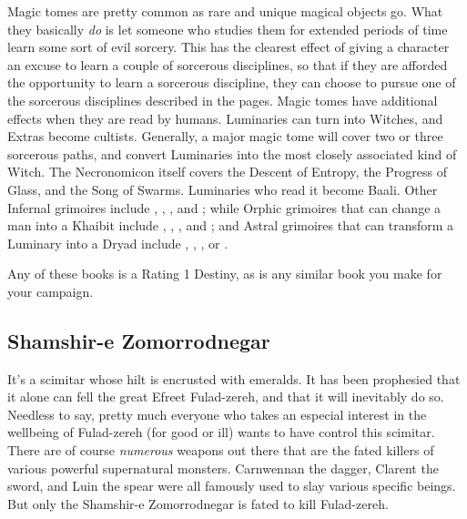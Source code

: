 Magic tomes are pretty common as rare and unique magical objects go. What they basically \textit{do} is let someone who studies them for extended periods of time learn some sort of evil sorcery. This has the clearest effect of giving a character an excuse to learn a couple of sorcerous disciplines, so that if they are afforded the opportunity to learn a sorcerous discipline, they can choose to pursue one of the sorcerous disciplines described in the pages. Magic tomes have additional effects when they are read by humans. Luminaries can turn into Witches, and Extras become cultists. Generally, a major magic tome will cover two or three sorcerous paths, and convert Luminaries into the most closely associated kind of Witch. The Necronomicon itself covers the Descent of Entropy, the Progress of Glass, and the Song of Swarms. Luminaries who read it become Baali. Other Infernal grimoires include , , , and ; while Orphic grimoires that can change a man into a Khaibit include , , , and ; and Astral grimoires that can transform a Luminary into a Dryad include , , , or .

Any of these books is a Rating 1 Destiny, as is any similar book you make for your campaign.

\subsection{Shamshir-e Zomorrodnegar}
\hspace{\parindent} It's a scimitar whose hilt is encrusted with emeralds. It has been prophesied that it alone can fell the great Efreet Fulad-zereh, and that it will inevitably do so. Needless to say, pretty much everyone who takes an especial interest in the wellbeing of Fulad-zereh (for good or ill) wants to have control this scimitar. There are of course \textit{numerous} weapons out there that are the fated killers of various powerful supernatural monsters. Carnwennan the dagger, Clarent the sword, and Luin the spear were all famously used to slay various specific beings. But only the  Shamshir-e Zomorrodnegar is fated to kill Fulad-zereh.

